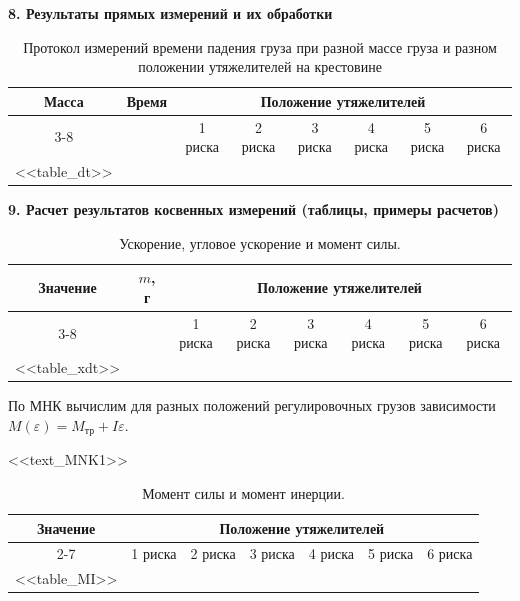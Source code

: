 \documentclass[14pt]{extreport}
\begin{document}
\noindent\textbf{8. Результаты прямых измерений и их обработки} 

\begin{table}[H]
\centering
\caption{Протокол измерений времени падения груза при разной массе груза и разном положении утяжелителей на крестовине}
\label{tab:direct104}
\begin{tabular}{|c|c|c|c|c|c|c|c|}
\hline
\multirow{2}{*}{\textbf{Масса}} & 
\multirow{2}{*}{\textbf{Время}} & 
\multicolumn{6}{c|}{\textbf{Положение утяжелителей}} \\ \cline{3-8}
& & 1 риска & 2 риска & 3 риска & 4 риска & 5 риска & 6 риска \\ \hline
<<table_dt>>
\end{tabular}
\end{table}

\noindent\textbf{9. Расчет результатов косвенных измерений (таблицы, примеры расчетов)} 

\begin{table}[H]
\centering
\caption{Ускорение, угловое ускорение и момент силы.}
\label{tab:indirect104}
\begin{tabular}{|c|c|c|c|c|c|c|c|}
\hline
\multirow{3}{*}{\textbf{Значение}} & 
\multirow{3}{*}{$m$, г} & 
\multicolumn{6}{c|}{\textbf{Положение утяжелителей}} \\ \cline{3-8}
& & 1 риска & 2 риска & 3 риска & 4 риска & 5 риска & 6 риска \\ \hline
<<table_xdt>>
\end{tabular}
\end{table}

По МНК вычислим для разных положений регулировочных грузов зависимости $M(\varepsilon) = M_\text{тр}+I\varepsilon$.

\begin{itemize}
<<text_MNK1>>
\end{itemize}

\begin{table}[H]
\centering
\caption{Момент силы и момент инерции.}
\label{tab:indirect2104}
\begin{tabular}{|c|c|c|c|c|c|c|}
\hline
\multirow{3}{*}{\textbf{Значение}} & 
\multicolumn{6}{c|}{\textbf{Положение утяжелителей}} \\ \cline{2-7}
& 1 риска & 2 риска & 3 риска & 4 риска & 5 риска & 6 риска \\ \hline
<<table_MI>>
\end{tabular}
\end{table}
\end{document}
